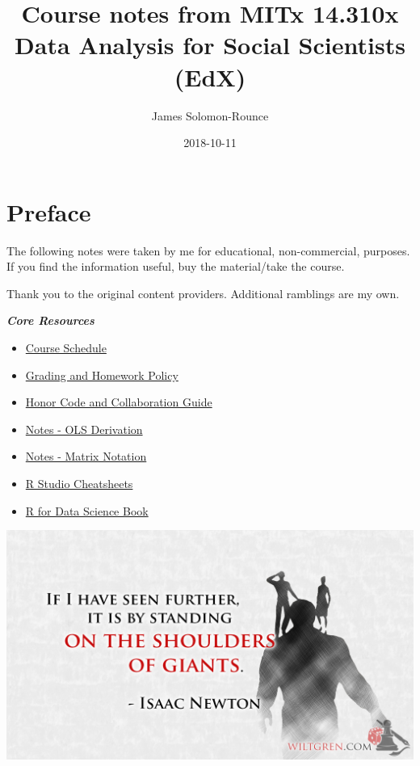 \documentclass[]{book}
\title{Course notes from MITx 14.310x Data Analysis for Social Scientists (EdX)}
\author{James Solomon-Rounce}
\date{2018-10-11}
\providecommand{\tightlist}{%
  \setlength{\itemsep}{0pt}\setlength{\parskip}{0pt}}
\theoremstyle{definition}
\theoremstyle{definition}
\theoremstyle{definition}
\theoremstyle{remark}
\begin{document}
\maketitle

{
\setcounter{tocdepth}{1}
\tableofcontents
}
\chapter*{Preface}\label{preface}

The following notes were taken by me for educational, non-commercial,
purposes. If you find the information useful, buy the material/take the
course.

Thank you to the original content providers. Additional ramblings are my
own.

\textbf{\emph{Core Resources}}

\begin{itemize}
\tightlist
\item
  \href{./files/14.310x_3T2018_Schedule.pdf}{Course Schedule}
\item
  \href{./files/14.310x_Grading_and_Homework_Policy__3T2018.pdf}{Grading
  and Homework Policy}
\item
  \href{./files/14310x_Honor_Code_and_Collaboration_Guidelines.pdf}{Honor
  Code and Collaboration Guide}
\item
  \href{./files/Derivation_of_OLS_Estimators.pdf}{Notes - OLS
  Derivation}
\item
  \href{./files/Matrix_Notation_etc.pdf}{Notes - Matrix Notation}
\item
  \href{https://www.rstudio.com/resources/cheatsheets/}{R Studio
  Cheatsheets}
\item
  \href{http://r4ds.had.co.nz/index.html}{R for Data Science Book}
\end{itemize}

\includegraphics[width=1\linewidth]{images/standing}
\end{document}
